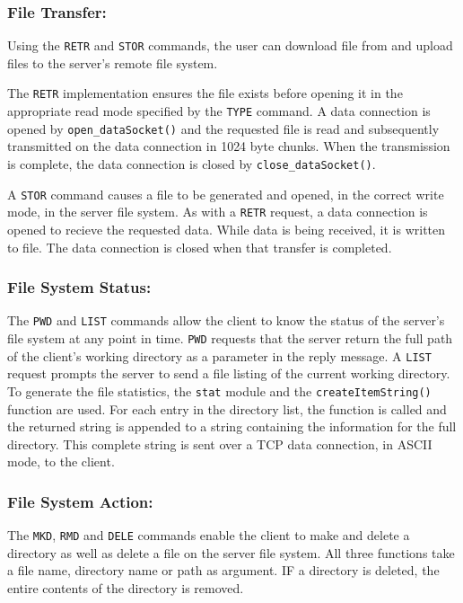 \documentclass[10pt,twocolumn]{witseiepaper}
\begin{document}
\vspace*{-2mm}
\subsubsection*{File Transfer:}
Using the \texttt{RETR} and \texttt{STOR} commands, the user can download file from and upload files to the server's remote file system. 

The \texttt{RETR} implementation ensures the file exists before opening it in the appropriate read mode specified by the \texttt{TYPE} command. A data connection is opened by \texttt{open\_dataSocket()} and the requested file is read and subsequently transmitted on the data connection in 1024 byte chunks. When the transmission is complete, the data connection is closed by \texttt{close\_dataSocket()}.

A \texttt{STOR} command causes a file to be generated and opened, in the correct write mode, in the server file system. As with a \texttt{RETR} request, a data connection is opened to recieve the requested data. While data is being received, it is written to file. The data connection is closed when that transfer is completed.

\vspace*{-2mm}
\subsubsection*{File System Status: }
The \texttt{PWD} and \texttt{LIST} commands allow the client to know the status of the server's file system at any point in time. \texttt{PWD} requests that the server return the full path of the client's working directory as a parameter in the reply message. A \texttt{LIST} request prompts the server to send a file listing of the current working directory. To generate the file statistics, the \texttt{stat} module and the \texttt{createItemString()} function are used. For each entry in the directory list, the function is called and the returned string is appended to a string containing the information for the full directory. This complete string is sent over a TCP data connection, in ASCII mode, to the client. 

\vspace*{-2mm}
\subsubsection*{File System Action: }
The \texttt{MKD}, \texttt{RMD} and \texttt{DELE} commands enable the client to make and delete a directory as well as delete a file on the server file system. All three functions take a file name, directory name or path as argument. IF a directory is deleted, the entire contents of the directory is removed.
\end{document}
